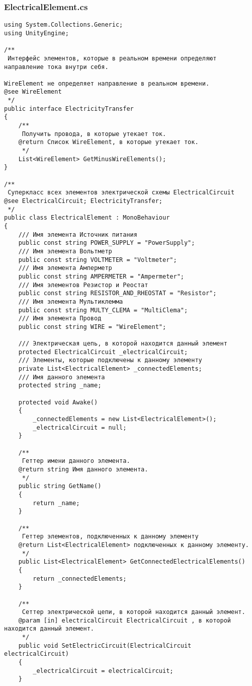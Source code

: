\subsubsection*{ElectricalElement.cs}
\begin{verbatim}
﻿using System.Collections.Generic;
using UnityEngine;

/**
 Интерфейс элементов, которые в реальном времени определяют направление тока внутри себя.

WireElement не определяет направление в реальном времени.
@see WireElement
 */
public interface ElectricityTransfer
{
    /**
     Получить провода, в которые утекает ток.
    @return Список WireElement, в которые утекает ток.
     */
    List<WireElement> GetMinusWireElements();
}

/**
 Суперкласс всех элементов электрической схемы ElectricalCircuit
@see ElectricalCircuit; ElectricityTransfer;
 */
public class ElectricalElement : MonoBehaviour
{
    /// Имя элемента Источник питания
    public const string POWER_SUPPLY = "PowerSupply";
    /// Имя элемента Вольтметр
    public const string VOLTMETER = "Voltmeter";
    /// Имя элемента Амперметр
    public const string AMPERMETER = "Ampermeter";
    /// Имя элементов Резистор и Реостат
    public const string RESISTOR_AND_RHEOSTAT = "Resistor";
    /// Имя элемента Мультиклемма
    public const string MULTY_CLEMA = "MultiClema";
    /// Имя элемента Провод
    public const string WIRE = "WireElement";

    /// Электрическая цепь, в которой находится данный элемент
    protected ElectricalCircuit _electricalCircuit;
    /// Элементы, которые подключены к данному элементу
    private List<ElectricalElement> _connectedElements;
    /// Имя данного элемента
    protected string _name;

    protected void Awake()
    {
        _connectedElements = new List<ElectricalElement>();
        _electricalCircuit = null;
    }

    /**
     Геттер имени данного элемента.
    @return string Имя данного элемента.
     */
    public string GetName()
    {
        return _name;
    }

    /**
     Геттер элементов, подключенных к данному элементу
    @return List<ElectricalElement> подключенных к данному элементу.
     */
    public List<ElectricalElement> GetConnectedElectricalElements()
    {
        return _connectedElements;
    }

    /**
     Сеттер электрической цепи, в которой находится данный элемент.
    @param [in] electricalCircuit ElectricalCircuit , в которой находится данный элемент.
     */
    public void SetElectricCircuit(ElectricalCircuit electricalCircuit)
    {
        _electricalCircuit = electricalCircuit;
    }


\end{verbatim}
